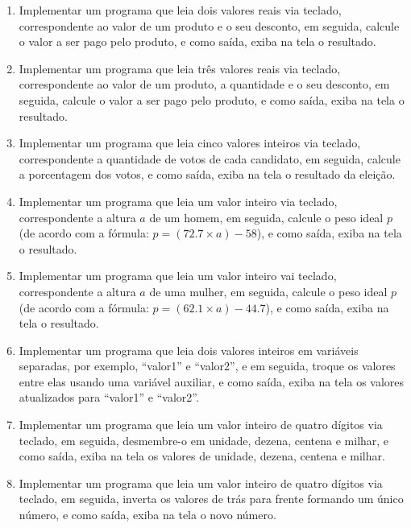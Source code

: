 \documentclass[11pt]{article}
\begin{document}
\begin{enumerate}
	\item Implementar um programa que leia dois valores reais via teclado, correspondente ao valor de um
	produto e o seu desconto, em seguida, calcule o valor a ser pago pelo produto, e como saída,
	exiba na tela o resultado.
	
	\item Implementar um programa que leia três valores reais via teclado, correspondente ao valor de um
	produto, a quantidade e o seu desconto, em seguida, calcule o valor a ser pago pelo produto, e
	como saída, exiba na tela o resultado.
	
	\item  Implementar um programa que leia cinco valores inteiros via teclado, correspondente a quantidade
	de votos de cada candidato, em seguida, calcule a porcentagem dos votos, e como saída, exiba
	na tela o resultado da eleição.
	
	\item  Implementar um programa que leia um valor inteiro via teclado, correspondente a altura $a$ de
	um homem, em seguida, calcule o peso ideal $p$ (de acordo com a fórmula: $p = (72.7 \times a) - 58$),
	e como saída, exiba na tela o resultado.
	
	\item Implementar um programa que leia um valor inteiro vai teclado, correspondente a altura $a$ de
	uma mulher, em seguida, calcule o peso ideal $p$ (de acordo com a fórmula: $p = (62.1 \times a) - 44.7$),
	e como saída, exiba na tela o resultado.
	
	\item  Implementar um programa que leia dois valores inteiros em variáveis separadas, por exemplo,
	``valor1'' e ``valor2'', e em seguida, troque os valores entre elas usando uma variável auxiliar, e
	como saída, exiba na tela os valores atualizados para ``valor1'' e ``valor2''.
	
	\item Implementar um programa que leia um valor inteiro de quatro dígitos via teclado, em seguida,
	desmembre-o em unidade, dezena, centena e milhar, e como saída, exiba na tela os valores de
	unidade, dezena, centena e milhar.
	
	\item  Implementar um programa que leia um valor inteiro de quatro dígitos via teclado, em seguida,
	inverta os valores de trás para frente formando um único número, e como saída, exiba na tela o
	novo número.
\end{enumerate}
\end{document}
